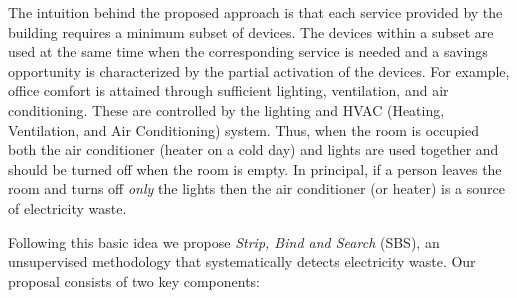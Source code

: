 The intuition behind the proposed approach is that each service provided by the building requires a minimum subset of devices.
The devices within a subset are used at the same time when the corresponding service is needed and a savings opportunity is characterized by the partial activation of the devices.
For example, office comfort is attained through sufficient lighting, ventilation, and air conditioning.
These are controlled by the lighting and HVAC (Heating, Ventilation, and Air Conditioning) system.
Thus, when the room is occupied both the air conditioner (heater on a cold day) and lights are used together and should be turned off 
when the room is empty.
In principal, if a person leaves the room and turns off \emph{only} the lights then the air conditioner (or heater) is a source of electricity waste.

Following this basic idea we propose \emph{Strip, Bind and Search} (SBS), an unsupervised methodology that systematically detects electricity waste.
Our proposal consists of two key components:

